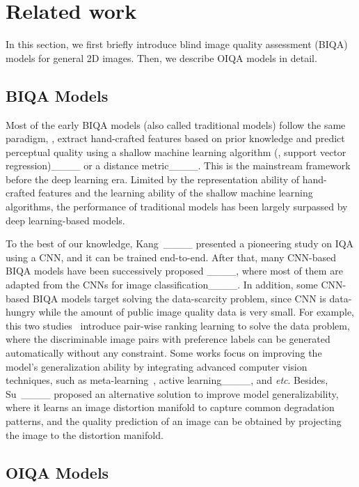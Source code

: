 \section{Related work}
\label{sec:rw}

In this section, we first briefly introduce blind image quality assessment (BIQA) models for general 2D images. Then, we describe OIQA models in detail.

\subsection{BIQA Models}

Most of the early BIQA models (also called traditional models) follow the same paradigm, \ie, extract hand-crafted features based on prior knowledge and predict perceptual quality using a shallow machine learning algorithm (\eg, support vector regression)____ or a distance metric____. This is the mainstream framework before the deep learning era. Limited by the representation ability of hand-crafted features and the learning ability of the shallow machine learning algorithms, the performance of traditional models has been largely surpassed by deep learning-based models.  

To the best of our knowledge, Kang~\et____ presented a pioneering study on IQA using a CNN, and it can be trained end-to-end. After that, many CNN-based BIQA models have been successively proposed ____, where most of them are adapted from the CNNs for image classification____. In addition, some CNN-based BIQA models target solving the data-scarcity problem, since CNN is data-hungry while the amount of public image quality data is very small. For example, this two studies~\cite {liu2017rankiqa, ma2017dipiq} introduce pair-wise ranking learning to solve the data problem, where the discriminable image pairs with preference labels can be generated automatically without any constraint. Some works focus on improving the model's generalization ability by integrating advanced computer vision techniques, such as meta-learning~\cite {zhu2020metaiqa}, active learning____, and \emph{etc}. Besides, Su~\et____ proposed an alternative solution to improve model generalizability, where it learns an image distortion manifold to capture common degradation patterns, and the quality prediction of an image can be obtained by projecting the image to the distortion manifold.

\subsection{OIQA Models}

